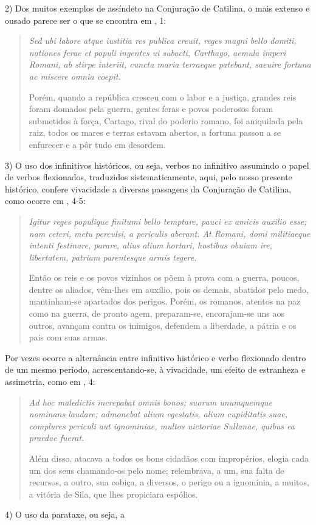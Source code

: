 2) Dos muitos exemplos de assíndeto na Conjuração de Catilina, o mais extenso e
ousado parece ser o que se encontra em , 1: \begin{quote} \emph{Sed ubi
  labore atque iustitia res publica creuit, reges magni bello domiti, nationes
ferae et populi ingentes ui subacti, Carthago, aemula imperi Romani, ab stirpe
interiit, cuncta maria terraeque patebant, saeuire fortuna ac miscere omnia
coepit.}

Porém, quando a república cresceu com o labor e a justiça, grandes reis foram
domados pela guerra, gentes feras e povos poderosos foram submetidos à força,
Cartago, rival do poderio romano, foi aniquilada pela raiz, todos os mares e
terras estavam abertos, a fortuna passou a se enfurecer e a pôr tudo em
desordem.  \end{quote} 3) O uso dos infinitivos históricos, ou seja, verbos no
infinitivo assumindo o papel de verbos flexionados, traduzidos
sistematicamente, aqui, pelo nosso presente histórico, confere vivacidade a
diversas passagens da Conjuração de Catilina, como ocorre em , 4-5:
\begin{quote} \emph{Igitur reges populique finitumi bello temptare, pauci ex
  amicis auxilio esse; nam ceteri, metu perculsi, a periculis aberant. At
Romani, domi militiaeque intenti festinare, parare, alius alium hortari,
hostibus obuiam ire, libertatem, patriam parentesque armis tegere.}

Então os reis e os povos vizinhos os põem à prova com a guerra, poucos, dentre
os aliados, vêm-lhes em auxílio, pois os demais, abatidos pelo medo,
mantinham-se apartados dos perigos. Porém, os romanos, atentos na paz como
na guerra, de pronto agem, preparam-se, encorajam-se uns aos outros, avançam
contra os inimigos, defendem a liberdade, a pátria e os pais com suas armas.
\end{quote} Por vezes ocorre a alternância entre infinitivo histórico e verbo
flexionado dentro de um mesmo período, acrescentando-se, à vivacidade, um
efeito de estranheza e assimetria, como em , 4: \begin{quote} \emph{Ad hoc
  maledictis increpabat omnis bonos; suorum unumquemque nominans laudare;
admonebat alium egestatis, alium cupiditatis suae, complures periculi aut
ignominiae, multos uictoriae Sullanae, quibus ea praedae fuerat.} 

Além disso,
atacava a todos os bons cidadãos com impropérios, elogia cada um dos seus
chamando-os pelo nome; relembrava, a um, sua falta de recursos, a outro, sua
cobiça, a diversos, o perigo ou a ignomínia, a muitos, a vitória de Sila, que
lhes propiciara espólios.  \end{quote} 4) O uso da parataxe, ou seja, a
